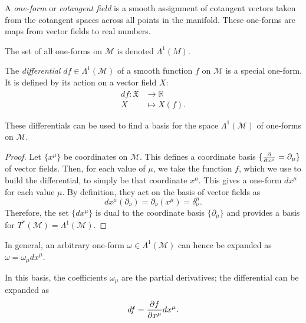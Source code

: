 \begin{definition}
  A \emph{one-form} or \emph{cotangent field} is a smooth assignment of cotangent vectors taken from the cotangent spaces across all points in the manifold.
  These one-forms are maps from vector fields to real numbers.
\end{definition}
\begin{notation}[]
  The set of all one-forms on $\mathcal{M}$ is denoted $\Lambda^1(M)$.
\end{notation}

\begin{definition}[differential]
  The \emph{differential} $df \in \Lambda^{1}(\mathcal{M})$ of a smooth function $f$ on $\mathcal{M}$ is a special one-form. It is defined by its action on a vector field $X$:
  \begin{equation}
    \label{eq:def_differential}
    \begin{split}
      df\colon \mathfrak{X} &\to \mathbb{R} \\
      X &\mapsto X(f).
    \end{split}
  \end{equation}
\end{definition}
\begin{claim}
  These differentials can be used to find a basis for the space $\Lambda^1(\mathcal{M})$ of one-forms on $\mathcal{M}$.
\end{claim}
\begin{proof}
  Let $\{x^\mu\}$ be coordinates on $\mathcal{M}$. This defines a coordinate basis $\{\pdv{}{x^\mu} = \partial_\mu \}$ of vector fields.
  Then, for each value of $\mu$, we take the function $f$, which we use to build the differential, to simply be that coordinate $x^\mu$. This gives a one-form $dx^\mu$ for each value $\mu$. By definition, they act on the basis of vector fields as
  \begin{equation}
    dx^\mu (\partial_\nu) = \partial_\nu(x^\mu) = \delta^\mu_\nu.
  \end{equation}
  Therefore, the set $\{dx^\mu\}$ is dual to the coordinate basis $\{\partial_\mu\}$ and provides a basis for $T^*(\mathcal{M}) = \Lambda^1 (\mathcal{M})$.
\end{proof}
\begin{corollary}
  In general, an arbitrary one-form $\omega \in \Lambda^1(\mathcal{M})$ can hence be expanded as $\omega = \omega_\mu dx^\mu$.
\end{corollary}
\begin{claim}
  In this basis, the coefficients $\omega_\mu$ are the partial derivatives; the differential can be expanded as
  \begin{equation}
    df = \pdv{f}{x^\mu} dx^\mu.
  \end{equation}
\end{claim}
